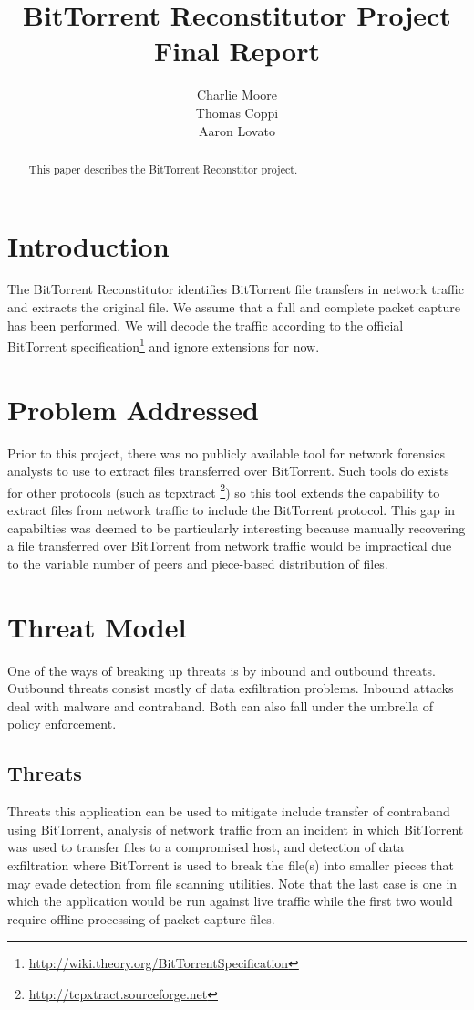 \documentclass{acm_proc_article-sp}
\author{
  \alignauthor
  Charlie Moore\\
  \email{cmoore@nmt.edu}
  \alignauthor
  Thomas Coppi\\
  \email{tcoppi@nmt.edu}
  \alignauthor
  Aaron Lovato\\
  \email{alovato@nmt.edu}
}
\title{BitTorrent Reconstitutor Project Final Report}
\begin{document}
\maketitle
\begin{abstract}
This paper describes the BitTorrent Reconstitor project.
\end{abstract}


\section{Introduction}
The BitTorrent Reconstitutor identifies BitTorrent file transfers in network
traffic and extracts the original file.  We assume that a full and complete
packet capture has been performed.  We will decode the traffic according to the
official BitTorrent
specification\footnote{\url{http://wiki.theory.org/BitTorrentSpecification}} and
ignore extensions for now.



\section{Problem Addressed}
Prior to this project, there was no publicly available tool for network 
forensics analysts to use to extract files transferred over BitTorrent. Such 
tools do exists for other protocols (such as tcpxtract
\footnote{\url{http://tcpxtract.sourceforge.net}}) so this tool extends the 
capability to extract files from network traffic to include the BitTorrent 
protocol. This gap in capabilties was deemed to be particularly interesting 
because manually recovering a file transferred over BitTorrent from network 
traffic would be impractical due to the variable number of peers and 
piece-based distribution of files.


\section{Threat Model}
One of the ways of breaking up threats is by inbound and outbound threats.
Outbound threats consist mostly of data exfiltration problems.  Inbound attacks
deal with malware and contraband.  Both can also fall under the umbrella of
policy enforcement.

\subsection{Threats}
Threats this application can be used to mitigate include transfer of contraband
using BitTorrent, analysis of network traffic from an incident in which
BitTorrent was used to transfer files to a compromised host, and detection of
data exfiltration where BitTorrent is used to break the file(s) into smaller
pieces that may evade detection from file scanning utilities. Note that the
last case is one in which the application would be run against live traffic
while the first two would require offline processing of packet capture files.
\end{document}
